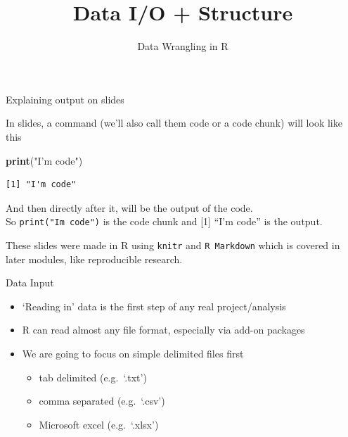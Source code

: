 \documentclass[
  ignorenonframetext,
]{beamer}
\title{Data I/O + Structure}
\author{Data Wrangling in R}
\date{}
\newenvironment{Shaded}{\begin{snugshade}}{\end{snugshade}}
\newcommand{\KeywordTok}[1]{\textcolor[rgb]{0.13,0.29,0.53}{\textbf{#1}}}
\newcommand{\NormalTok}[1]{#1}
\newcommand{\StringTok}[1]{\textcolor[rgb]{0.31,0.60,0.02}{#1}}
\providecommand{\tightlist}{%
  \setlength{\itemsep}{0pt}\setlength{\parskip}{0pt}}
\begin{document}
\frame{\titlepage}

\begin{frame}[fragile]{Explaining output on slides}
\protect\hypertarget{explaining-output-on-slides}{}

In slides, a command (we'll also call them code or a code chunk) will
look like this

\begin{Shaded}
\begin{Highlighting}[]
\KeywordTok{print}\NormalTok{(}\StringTok{"I'm code"}\NormalTok{)}
\end{Highlighting}
\end{Shaded}

\begin{verbatim}
[1] "I'm code"
\end{verbatim}

And then directly after it, will be the output of the code.\\
So \texttt{print("I\textquotesingle{}m\ code")} is the code chunk and
{[}1{]} ``I'm code'' is the output.

These slides were made in R using \texttt{knitr} and
\texttt{R\ Markdown} which is covered in later modules, like
reproducible research.

\end{frame}

\begin{frame}{Data Input}
\protect\hypertarget{data-input}{}

\begin{itemize}
\tightlist
\item
  `Reading in' data is the first step of any real project/analysis
\item
  R can read almost any file format, especially via add-on packages
\item
  We are going to focus on simple delimited files first

  \begin{itemize}
  \tightlist
  \item
    tab delimited (e.g.~`.txt')
  \item
    comma separated (e.g.~`.csv')
  \item
    Microsoft excel (e.g.~`.xlsx')
  \end{itemize}
\end{itemize}

\end{frame}
\end{document}
